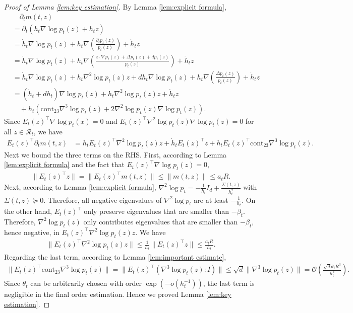 \documentclass[11pt]{article}
\newcommand{\mc}{\mathcal}
\begin{document}
\begin{proof}[Proof of Lemma \ref{lem:key estimation}] By Lemma \ref{lem:explicit formula},
\begin{align*}
     &\quad \partial_t m(t,z)  \\
     & =  \partial_t (h_t \nabla\log p_t(z) + h_t z  ) \\
    & = \Dot{h}_t\nabla\log p_t(z) + h_t\nabla ( \frac{\partial_t p_t(z)}{p_t(z)} ) + \Dot{h}_t z  \\
    &= \Dot{h}_t\nabla\log p_t(z) + h_t\nabla ( \frac{z\cdot \nabla p_t(z)+\Delta p_t(z)+d p_t(z)}{p_t(z)} ) + \Dot{h}_t z \\
    & = \Dot{h}_t\nabla\log p_t(z) + h_t \nabla^2 \log p_t(z) z + d h_t \nabla\log p_t(z) + h_t \nabla (\frac{\Delta p_t(z)}{p_t(z)})  + \Dot{h}_t z \\
    & = (\Dot{h}_t+d h_t)\nabla\log p_t(z)+ h_t \nabla^2 \log p_t(z) z + \Dot{h}_t z \\
    &\quad + h_t( \mathrm{cont}_{23} \nabla^3\log p_t(z)+2\nabla^2\log p_t(z)\nabla\log p_t(z) ) .
\end{align*}
Since $E_t(z)^\intercal \nabla\log p_t(x)=0$ and $E_t(z)^\intercal \nabla^2\log p_t(z)\nabla\log p_t(z)=0$ for all $z\in \mc{R}_t$, we have
\begin{align*}
    E_t(z)^\intercal \partial_t m(t,z) &= h_t E_t(z)^\intercal\nabla^2 \log p_t(z)  z + \Dot{h}_t E_t(z)^\intercal z  + h_tE_t(z)^\intercal \mathrm{cont}_{23} \nabla^3\log p_t(z).
\end{align*}
Next we bound the three terms on the RHS. First, according to Lemma \ref{lem:explicit formula} and the fact that $E_t(z)^\intercal \nabla \log p_t(z)=0$,
\begin{align*}
    \| E_t(z)^\intercal z \| = \|  E_t(z)^\intercal m(t,z) \| \le \| m(t,z) \| \le a_t R.
\end{align*}
Next, according to Lemma \ref{lem:explicit formula}, $\nabla^2\log p_t=-\tfrac{1}{h_t} I_d + \tfrac{\Sigma(t,z)}{h_t^2}$ with $\Sigma(t,z)\succeq 0$. Therefore, all negative eigenvalues of $\nabla^2\log p_t$ are at least $-\tfrac{1}{h_t}$. On the other hand, $E_t(z)^\intercal$ only preserve eigenvalues that are smaller than $-\beta_t$. Therefore, $\nabla^2\log p_t(z)$ only contributes eigenvalues that are smaller than $-\beta_t$, hence negative, in $E_t(z)^\intercal\nabla^2 \log p_t(z)  z$. We have
\begin{align*}
    \| E_t(z)^\intercal\nabla^2 \log p_t(z)  z \| \le \frac{1}{h_t}\| E_t(z)^\intercal z \| \le \frac{a_t R}{h_t}.
\end{align*}
Regarding the last term, according to Lemma \ref{lem:important estimate},
\begin{align*}
    \| E_t(z)^\intercal \mathrm{cont}_{23} \nabla^3\log p_t(z)\| =  \| E_t(z)^\intercal (\nabla^3\log p_t(z) : I)\| \le \sqrt{d} \| \nabla^3\log p_t(z) \| = \mc{O}(\frac{\sqrt{d}\theta_t R^3}{h_t^3}) .
\end{align*}
Since $\theta_t$ can be arbitrarily chosen with order $\exp(- o(h_{t}^{-1}) )$, the last term is negligible in the final order estimation. Hence we proved Lemma \ref{lem:key estimation}.
\end{proof}
\end{document}

